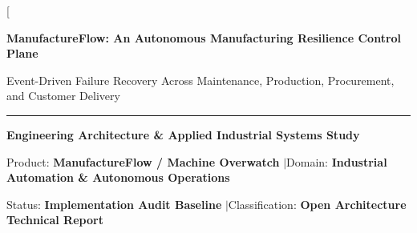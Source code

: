 \documentclass[10pt,twocolumn,a4paper]{article}
\begin{document}
\twocolumn[{%
\begin{center}
  {\LARGE\bfseries\color{inkblack} ManufactureFlow: An Autonomous Manufacturing Resilience Control Plane}\par\vspace{0.4em}
  {\large\color{deepslate} Event-Driven Failure Recovery Across Maintenance, Production, Procurement, and Customer Delivery}\par\vspace{0.8em}
  \rule{0.6\textwidth}{0.5pt}\par\vspace{0.8em}
  {\small\textbf{Engineering Architecture \& Applied Industrial Systems Study}}\par\vspace{0.2em}
  {\footnotesize Product: \textbf{ManufactureFlow / Machine Overwatch} \quad$|$\quad Domain: \textbf{Industrial Automation \& Autonomous Operations}}\par\vspace{0.2em}
  {\footnotesize Status: \textbf{Implementation Audit Baseline} \quad$|$\quad Classification: \textbf{Open Architecture Technical Report}}\par\vspace{1.2em}
\end{center}

}
\end{document}
